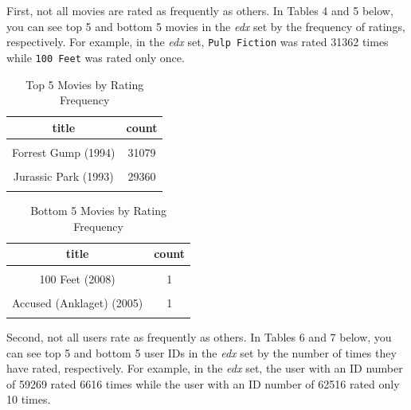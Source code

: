 \documentclass[
]{article}
\begin{document}
\hfill\break
\hfill\break
First, not all movies are rated as frequently as others. In Tables 4 and
5 below, you can see top 5 and bottom 5 movies in the \emph{edx} set by
the frequency of ratings, respectively. For example, in the \emph{edx}
set, \texttt{Pulp\ Fiction} was rated 31362 times while
\texttt{100\ Feet} was rated only once.

\begin{table}[H]

\caption{\label{tab:Table 4: Top 5 Movies by Rating Frequency}Top 5 Movies by Rating Frequency}
\centering
\fontsize{11}{13}\selectfont
\begin{tabular}[t]{|>{}c|||>{}c|}
\hline
title & count\\
\hline
\cellcolor{gray!6}{Pulp Fiction (1994)} & \cellcolor{gray!6}{31362}\\
\hline
Forrest Gump (1994) & 31079\\
\hline
\cellcolor{gray!6}{Silence of the Lambs, The (1991)} & \cellcolor{gray!6}{30382}\\
\hline
Jurassic Park (1993) & 29360\\
\hline
\cellcolor{gray!6}{Shawshank Redemption, The (1994)} & \cellcolor{gray!6}{28015}\\
\hline
\end{tabular}
\end{table}

\begin{table}[H]

\caption{\label{tab:Table 5: Bottom 5 Movies by Rating Frequency}Bottom 5 Movies by Rating Frequency}
\centering
\fontsize{11}{13}\selectfont
\begin{tabular}[t]{|>{}c|||>{}c|}
\hline
title & count\\
\hline
\cellcolor{gray!6}{1, 2, 3, Sun (Un, deuz, trois, soleil) (1993)} & \cellcolor{gray!6}{1}\\
\hline
100 Feet (2008) & 1\\
\hline
\cellcolor{gray!6}{4 (2005)} & \cellcolor{gray!6}{1}\\
\hline
Accused (Anklaget) (2005) & 1\\
\hline
\cellcolor{gray!6}{Ace of Hearts (2008)} & \cellcolor{gray!6}{1}\\
\hline
\end{tabular}
\end{table}

Second, not all users rate as frequently as others. In Tables 6 and 7
below, you can see top 5 and bottom 5 user IDs in the \emph{edx} set by
the number of times they have rated, respectively. For example, in the
\emph{edx} set, the user with an ID number of 59269 rated 6616 times
while the user with an ID number of 62516 rated only 10 times.
\end{document}
